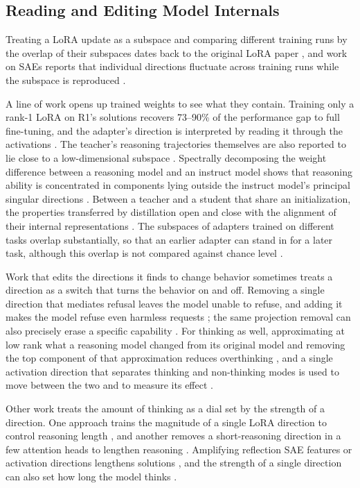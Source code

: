 \subsection{Reading and Editing Model Internals}

Treating a LoRA update as a subspace and comparing different training runs by the overlap of their subspaces dates back to the original LoRA paper \citep{hu2021lora}, and work on SAEs reports that individual directions fluctuate across training runs while the subspace is reproduced \citep{gerasimov2026unstable}.

A line of work opens up trained weights to see what they contain. Training only a rank-1 LoRA on R1's solutions recovers 73--90\% of the performance gap to full fine-tuning, and the adapter's direction is interpreted by reading it through the activations \citep{ward2025rank1}. The teacher's reasoning trajectories themselves are also reported to lie close to a low-dimensional subspace \citep{solgi2026lori}. Spectrally decomposing the weight difference between a reasoning model and an instruct model shows that reasoning ability is concentrated in components lying outside the instruct model's principal singular directions \citep{ma2026spectral}. Between a teacher and a student that share an initialization, the properties transferred by distillation open and close with the alignment of their internal representations \citep{chauhan2026covert}. The subspaces of adapters trained on different tasks overlap substantially, so that an earlier adapter can stand in for a later task, although this overlap is not compared against chance level \citep{dieudonne2026adapter}.

Work that edits the directions it finds to change behavior sometimes treats a direction as a switch that turns the behavior on and off. Removing a single direction that mediates refusal leaves the model unable to refuse, and adding it makes the model refuse even harmless requests \citep{arditi2024refusal}; the same projection removal can also precisely erase a specific capability \citep{fu2026scalpel}. For thinking as well, approximating at low rank what a reasoning model changed from its original model and removing the top component of that approximation reduces overthinking \citep[Gold-Switch;][]{lee2025goldswitch}, and a single activation direction that separates thinking and non-thinking modes is used to move between the two and to measure its effect \citep{liu2026leakage}.

Other work treats the amount of thinking as a dial set by the strength of a direction. One approach trains the magnitude of a single LoRA direction to control reasoning length \citep{ma2025cotvalve}, and another removes a short-reasoning direction in a few attention heads to lengthen reasoning \citep{sun2025thinkedit}. Amplifying reflection SAE features or activation directions lengthens solutions \citep{galichin2026covered,sheng2025planning}, and the strength of a single direction can also set how long the model thinks \citep{jayabahu2026halt}.

